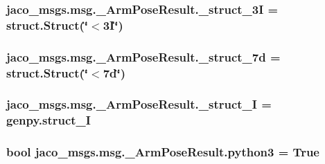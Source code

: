 \subsubsection[{\texorpdfstring{\+\_\+struct\+\_\+3I}{_struct_3I}}]{\setlength{\rightskip}{0pt plus 5cm}jaco\+\_\+msgs.\+msg.\+\_\+\+Arm\+Pose\+Result.\+\_\+struct\+\_\+3I = struct.\+Struct(\char`\"{}$<$3\+I\char`\"{})\hspace{0.3cm}{\ttfamily [private]}}\hypertarget{namespacejaco__msgs_1_1msg_1_1__ArmPoseResult_a9bfa1b7c53beb03a2ecfc00157110816}{}\label{namespacejaco__msgs_1_1msg_1_1__ArmPoseResult_a9bfa1b7c53beb03a2ecfc00157110816}
\subsubsection[{\texorpdfstring{\+\_\+struct\+\_\+7d}{_struct_7d}}]{\setlength{\rightskip}{0pt plus 5cm}jaco\+\_\+msgs.\+msg.\+\_\+\+Arm\+Pose\+Result.\+\_\+struct\+\_\+7d = struct.\+Struct(\char`\"{}$<$7d\char`\"{})\hspace{0.3cm}{\ttfamily [private]}}\hypertarget{namespacejaco__msgs_1_1msg_1_1__ArmPoseResult_a99dcf874612f38f9141b40b564add612}{}\label{namespacejaco__msgs_1_1msg_1_1__ArmPoseResult_a99dcf874612f38f9141b40b564add612}
\subsubsection[{\texorpdfstring{\+\_\+struct\+\_\+I}{_struct_I}}]{\setlength{\rightskip}{0pt plus 5cm}jaco\+\_\+msgs.\+msg.\+\_\+\+Arm\+Pose\+Result.\+\_\+struct\+\_\+I = genpy.\+struct\+\_\+I\hspace{0.3cm}{\ttfamily [private]}}\hypertarget{namespacejaco__msgs_1_1msg_1_1__ArmPoseResult_afea04cee05e4acd11ef6f03501af23a3}{}\label{namespacejaco__msgs_1_1msg_1_1__ArmPoseResult_afea04cee05e4acd11ef6f03501af23a3}
\subsubsection[{\texorpdfstring{python3}{python3}}]{\setlength{\rightskip}{0pt plus 5cm}bool jaco\+\_\+msgs.\+msg.\+\_\+\+Arm\+Pose\+Result.\+python3 = True}\hypertarget{namespacejaco__msgs_1_1msg_1_1__ArmPoseResult_a24caf717852f7d21f4d8076263c067a8}{}\label{namespacejaco__msgs_1_1msg_1_1__ArmPoseResult_a24caf717852f7d21f4d8076263c067a8}
